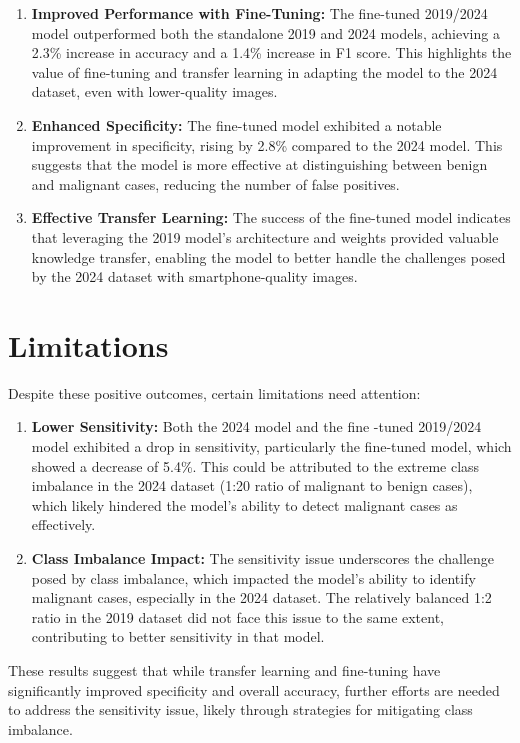 \documentclass{article}
\begin{document}
\begin{enumerate}
    \item \textbf{Improved Performance with Fine-Tuning:} The fine-tuned 2019/2024 model outperformed both the
standalone 2019 and 2024 models, achieving a 2.3\% increase in accuracy and a 1.4\% increase in F1 score.
This highlights the value of fine-tuning and transfer learning in adapting the model to the 2024 dataset,
even with lower-quality images.
    \item \textbf{Enhanced Specificity:} The fine-tuned model exhibited a notable improvement in specificity, rising by 2.8\%
compared to the 2024 model. This suggests that the model is more effective at distinguishing between
benign and malignant cases, reducing the number of false positives.
    \item \textbf{Effective Transfer Learning:} The success of the fine-tuned model indicates that leveraging the 2019
model’s architecture and weights provided valuable knowledge transfer, enabling the model to better
handle the challenges posed by the 2024 dataset with smartphone-quality images.
\end{enumerate}

\section{Limitations}

Despite these positive outcomes, certain limitations need attention:

\begin{enumerate}
    \item \textbf{Lower Sensitivity:} Both the 2024 model and the fine -tuned 2019/2024 model exhibited a drop in
sensitivity, particularly the fine-tuned model, which showed a decrease of 5.4\%. This could be attributed to
the extreme class imbalance in the 2024 dataset (1:20 ratio of malignant to benign cases), which likely
hindered the model’s ability to detect malignant cases as effectively.
    \item \textbf{Class Imbalance Impact:} The sensitivity issue underscores the challenge posed by class imbalance, which
impacted the model's ability to identify malignant cases, especially in the 2024 dataset. The relatively
balanced 1:2 ratio in the 2019 dataset did not face this issue to the same extent, contributing to better
sensitivity in that model.
\end{enumerate}

These results suggest that while transfer learning and fine-tuning have significantly improved specificity and overall
accuracy, further efforts are needed to address the sensitivity issue, likely through strategies for mitigating class
imbalance.
\end{document}
